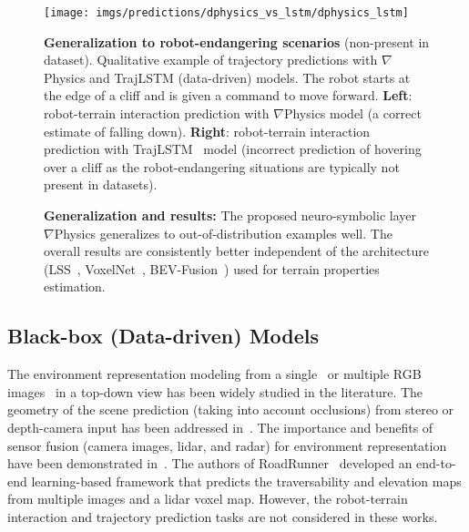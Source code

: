 \begin{figure}[t!]
\centering
\texttt{[image: imgs/predictions/dphysics\_vs\_lstm/dphysics\_lstm]}
\caption{\textbf{Generalization to robot-endangering scenarios} (non-present in dataset).
    Qualitative example of trajectory predictions with $\nabla$Physics and TrajLSTM (data-driven) models.
    The robot starts at the edge of a cliff and is given a command to move forward.
    \textbf{Left}: robot-terrain interaction prediction with $\nabla$Physics model (a correct estimate of falling down).
    \textbf{Right}: robot-terrain interaction prediction with TrajLSTM~\cite{pang2019aircraft} model
    (incorrect prediction of hovering over a cliff as the robot-endangering situations are typically not present in datasets).}
    \label{fig:dphysics_v_lstm}
\end{figure}
\begin{figure}
    \centering
    \caption{\textbf{Generalization and results:} The proposed neuro-symbolic layer $\nabla$Physics generalizes to out-of-distribution examples well.
    The overall results are consistently better independent of the architecture
        (LSS~\cite{philion2020lift}, VoxelNet~\cite{zhou2018voxelnet}, BEV-Fusion~\cite{liu2023bevfusion}) used for terrain properties estimation.}
    \label{fig:traj_errors}
\end{figure}

\subsection{Black-box (Data-driven) Models}\label{subsec:black-box-models}

The environment representation modeling from a single~\cite{mani2020monolayout} or
multiple RGB images~\cite{philion2020lift} in a top-down view has been widely studied in the literature.
The geometry of the scene prediction (taking into account occlusions) from stereo or depth-camera input
has been addressed in~\cite{watson2020footprints}.
The importance and benefits of sensor fusion (camera images, lidar, and radar) for environment representation
have been demonstrated in~\cite{hendy2020fishing}.
The authors of RoadRunner~\cite{frey2024roadrunner} developed an end-to-end learning-based framework
that predicts the traversability and elevation maps from multiple images and a lidar voxel map.
However, the robot-terrain interaction and trajectory prediction tasks are not considered in these works.

